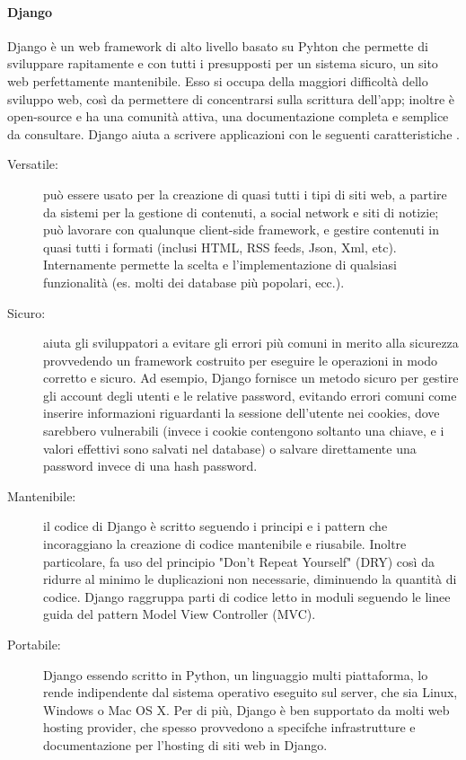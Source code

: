 \paragraph{Django}
Django è un web framework di alto livello basato su Pyhton che permette di sviluppare rapitamente e con tutti i presupposti per un sistema sicuro, un sito web
perfettamente mantenibile. Esso si occupa della maggiori difficoltà dello sviluppo web, così da permettere di concentrarsi sulla scrittura dell'app; inoltre 
è open-source e ha una comunità attiva, una documentazione completa e semplice da consultare.\hfill\break
Django aiuta a scrivere applicazioni con le seguenti caratteristiche \cite{django-documentation}.
\begin{description}
    \item[Versatile:] può essere usato per la creazione di quasi tutti i tipi di siti web, a partire da sistemi per la gestione di contenuti,
    a social network e siti di notizie; può lavorare con qualunque client-side framework, e gestire contenuti in quasi tutti i formati (inclusi HTML, 
    RSS feeds, Json, Xml, etc). Internamente permette la scelta e l'implementazione di qualsiasi funzionalità (es. molti dei database più popolari, ecc.).
    \item[Sicuro:] aiuta gli sviluppatori a evitare gli errori più comuni in merito alla sicurezza provvedendo un framework costruito per eseguire 
    le operazioni in modo corretto e sicuro. Ad esempio, Django fornisce un metodo sicuro per gestire gli account degli utenti e le relative 
    password, evitando errori comuni come inserire informazioni riguardanti la sessione dell'utente nei cookies, dove sarebbero vulnerabili (invece i cookie 
    contengono soltanto una chiave, e i valori effettivi sono salvati nel database) o salvare direttamente una password invece di una hash password.
    \item[Mantenibile:] il codice di Django è scritto seguendo i principi e i pattern che incoraggiano la creazione di codice mantenibile e riusabile. Inoltre 
    particolare, fa uso del principio "Don't Repeat Yourself" (DRY) così da ridurre al minimo le duplicazioni non necessarie, diminuendo la quantità di codice.
    Django raggruppa parti di codice letto in moduli seguendo le linee guida del pattern Model View Controller (MVC).
    \item[Portabile:] Django essendo scritto in Python, un linguaggio multi piattaforma, lo rende indipendente dal sistema operativo eseguito sul server, che 
    sia Linux, Windows o Mac OS X. Per di più, Django è ben supportato da molti web hosting provider, che spesso provvedono a specifche infrastrutture
    e documentazione per l'hosting di siti web in Django.
\end{description}
